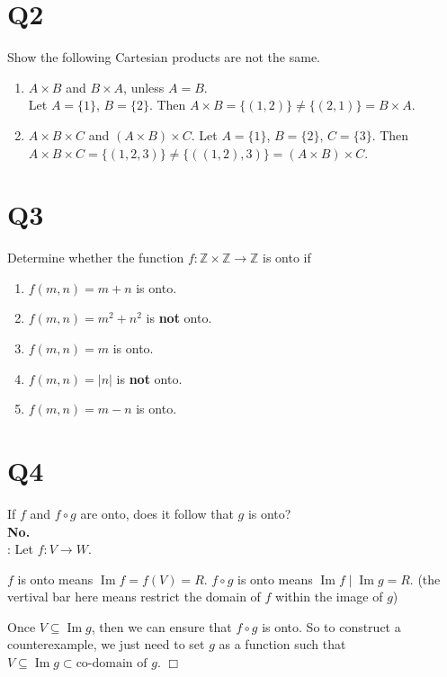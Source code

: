 \documentclass[11pt]{article}
\newenvironment{qparts}{\begin{enumerate}[{(}a{)}]}{\end{enumerate}}
\def\endproofmark{$\Box$}
\newenvironment{proof}{{\bf Proof}:}{\endproofmark\smallskip}
\begin{document}
\section*{Q2}
Show the following Cartesian products are not the same.
\begin{qparts}
    \item $A \times B$ and $B \times A$, unless $A = B$. \\
    Let $A=\{ 1 \}$, $B=\{ 2 \}$.
    Then $A \times B=\{ (1,2) \}\neq \{ (2,1) \}=B \times A$.
    
    \item $A \times B \times C$ and $(A \times B )\times C$.
    Let $A=\{ 1 \}$, $B=\{ 2 \}$, $C=\{ 3 \}$.
    Then $A \times B \times C=\{ (1,2,3) \}\neq \{ ((1,2),3) \}=(A\times B)\times C$.
\end{qparts}

\section*{Q3}
Determine whether the function $f \colon \mathbb{Z} \times \mathbb{Z} \to \mathbb{Z}$ is onto if
\begin{qparts}
    
    \item $f(m,n)=m+n$ is onto.
    \item $f(m,n)=m^{2}+n^{2}$ is \textbf{not} onto.
    \item $f(m,n)=m$ is onto.
    \item $f(m,n)=\left\vert n \right\vert $ is \textbf{not} onto.
    \item $f(m,n)=m-n$ is onto.
\end{qparts}

\section*{Q4}
If $f$ and $f \circ g$ are onto, does it follow that $g$ is onto? \\
\textbf{No.}\\
\begin{proof}
    Let $f \colon V \to W$. 

    $f$ is onto means
    $\operatorname{Im}f=f(V)=R$. $f \circ  g$ is onto means $\operatorname{Im} f \mid \operatorname{Im} g=R$. (the vertival bar here means restrict the domain of $f$ within the image of $g$)
    
    Once $V \subseteq \operatorname{Im} g $, then we can ensure that $f \circ  g$ is onto. So to construct a counterexample, we just need to set $g$ as 
    a function such that $V \subseteq \operatorname{Im} g \subset \text{co-domain of } g$.
\end{proof}
\end{document}
